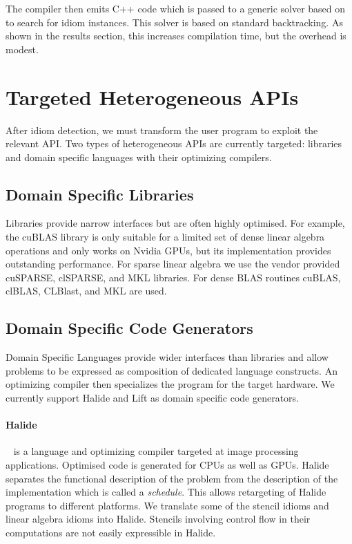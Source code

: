     The compiler then emits C++ code which is passed to a generic solver based on \cite{ginsbach2017discovery} to search for idiom instances.
    This solver is based on standard backtracking.
    As shown in the results section, this increases compilation time, but the overhead is modest.

\section{Targeted Heterogeneous APIs}

    After idiom detection, we must transform the user program to exploit the
    relevant API.
    Two types of heterogeneous APIs are currently targeted: libraries and domain
    specific languages with their optimizing compilers.

    \subsection{Domain Specific Libraries}
    Libraries provide narrow interfaces but are often highly optimised.
    For example, the cuBLAS library is only suitable for a limited set of dense
    linear algebra operations and only works on Nvidia GPUs, but its
    implementation provides outstanding performance.
    For sparse linear algebra we use the vendor provided cuSPARSE, clSPARSE, and
    MKL libraries.
    For dense BLAS routines cuBLAS, clBLAS, CLBlast, and MKL are used.

    \subsection{Domain Specific Code Generators}
    Domain Specific Languages provide wider interfaces than libraries and allow
    problems to be expressed as composition of dedicated language constructs.
    An optimizing compiler then specializes the program for the target hardware.
    We currently support Halide and Lift as domain specific code generators.

    \paragraph{Halide}~\cite{Ragan-Kelley2013Halide} is a language and
    optimizing compiler targeted at image processing applications.
    Optimised code is generated for CPUs as well as GPUs.
    Halide separates the functional description of the problem from the
    description of the implementation which is called a \emph{schedule}.
    This allows retargeting of Halide programs to different platforms.
    We translate some of the stencil idioms and linear algebra idioms into
    Halide.
    Stencils involving control flow in their computations are not easily
    expressible in Halide.

